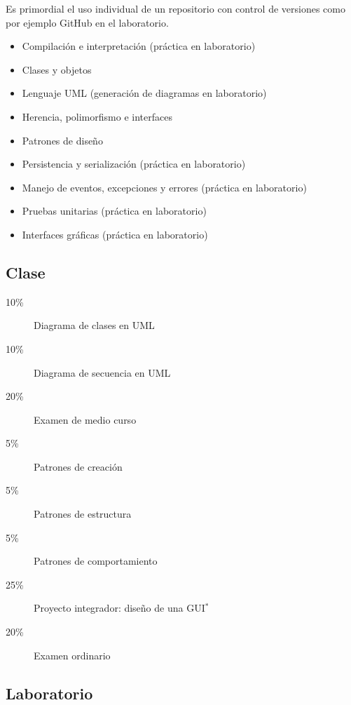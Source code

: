 \documentclass{article}
\begin{document}
\begin{multicols}{4}
Es primordial el uso individual de un repositorio con control de
versiones como por ejemplo GitHub en el laboratorio.

\begin{itemize}
\item{Compilaci\'{o}n e interpretaci\'{o}n (pr\'{a}ctica en laboratorio)}
\item{Clases y objetos}
\item{Lenguaje UML (generaci\'{o}n de diagramas en laboratorio)}
\item{Herencia, polimorfismo e interfaces}
\item{Patrones de dise\~{n}o}
\item{Persistencia y serializaci\'{o}n (pr\'{a}ctica en laboratorio)}
\item{Manejo de eventos, excepciones y errores (pr\'{a}ctica en
  laboratorio)}
\item{Pruebas unitarias (pr\'{a}ctica en laboratorio)}
\item{Interfaces gr\'{a}ficas (pr\'{a}ctica en laboratorio)}
\end{itemize}

\subsection*{Clase}

\begin{description}
\item[10\%]{Diagrama de clases en UML}
\item[10\%]{Diagrama de secuencia en UML}
\item[20\%]{Examen de medio curso}
\item[5\%]{Patrones de creaci\'{o}n}
\item[5\%]{Patrones de estructura}
\item[5\%]{Patrones de comportamiento}
\item[25\%]{Proyecto integrador: dise\~{n}o de una GUI$^\ast$}      
\item[20\%]{Examen ordinario}
\end{description}

\subsection*{Laboratorio}


\end{multicols}
\end{document}
